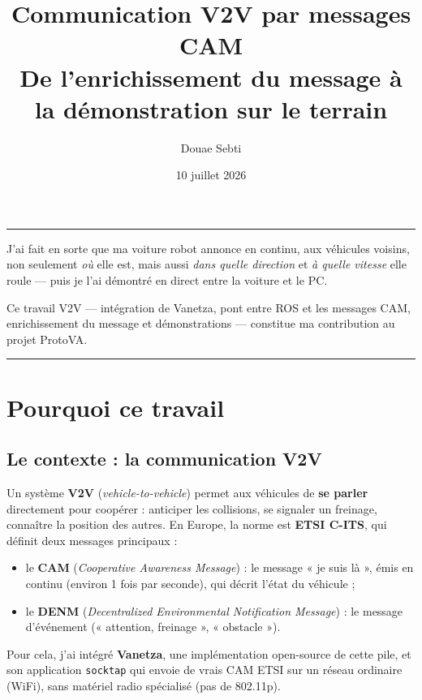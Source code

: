 \documentclass[a4paper,11pt]{article}
\title{\vspace{-1cm}\textbf{Communication V2V par messages CAM \\[2pt]
\large De l'enrichissement du message à la démonstration sur le terrain}}
\author{Douae Sebti}
\date{10 juillet 2026}
\newcommand{\code}[1]{\texttt{#1}}
\begin{document}
\maketitle
\vspace{-6pt}\hrule\vspace{10pt}

\begin{note}
J'ai fait en sorte que ma voiture robot annonce en continu, aux véhicules voisins, non
seulement \emph{où} elle est, mais aussi \emph{dans quelle direction} et \emph{à quelle
vitesse} elle roule --- puis je l'ai démontré en direct entre la voiture et le PC.
\end{note}

\begin{note}[Ma contribution]
Ce travail V2V --- intégration de Vanetza, pont entre ROS et les messages CAM, enrichissement
du message et démonstrations --- constitue ma contribution au projet ProtoVA.
\end{note}

\tableofcontents
\vspace{8pt}\hrule

\section{Pourquoi ce travail}

\subsection{Le contexte : la communication V2V}
Un système \textbf{V2V} (\emph{vehicle-to-vehicle}) permet aux véhicules de \textbf{se parler}
directement pour coopérer : anticiper les collisions, se signaler un freinage, connaître la
position des autres. En Europe, la norme est \textbf{ETSI C-ITS}, qui définit deux messages
principaux :
\begin{itemize}[leftmargin=1.6em]
  \item le \textbf{CAM} (\emph{Cooperative Awareness Message}) : le message « je suis là »,
        émis en continu (environ 1 fois par seconde), qui décrit l'état du véhicule ;
  \item le \textbf{DENM} (\emph{Decentralized Environmental Notification Message}) : le message
        d'événement (« attention, freinage », « obstacle »).
\end{itemize}
Pour cela, j'ai intégré \textbf{Vanetza}, une implémentation open-source de cette pile, et son
application \code{socktap} qui envoie de vrais CAM ETSI sur un réseau ordinaire (WiFi), sans
matériel radio spécialisé (pas de 802.11p).
\end{document}
